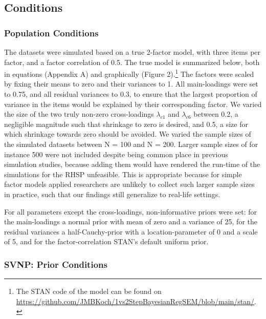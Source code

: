 \documentclass[
  man, donotrepeattitle,floatsintext]{apa6}
\begin{document}
\hypertarget{conditions}{%
\subsection{Conditions}\label{conditions}}

\hypertarget{population-conditions}{%
\subsubsection{Population Conditions}\label{population-conditions}}

The datasets were simulated based on a true 2-factor model, with three items per factor, and a factor correlation of 0.5. The true model is summarized below, both in equations (Appendix A) and graphically (Figure 2).\footnote{The STAN code of the model can be found on \url{https://github.com/JMBKoch/1vs2StepBayesianRegSEM/blob/main/stan/}.} The factors were scaled by fixing their means to zero and their variances to 1. All main-loadings were set to 0.75, and all residual variances to 0.3, to ensure that the largest proportion of variance in the items would be explained by their corresponding factor. We varied the size of the two truly non-zero cross-loadings \(\lambda_{c 1}\) and \(\lambda_{c 6}\) between 0.2, a negligible magnitude such that shrinkage to zero is desired, and 0.5, a size for which shrinkage towards zero should be avoided. We varied the sample sizes of the simulated datasets between N = 100 and N = 200. Larger sample sizes of for instance 500 were not included despite being common place in previous simulation studies, because adding them would have rendered the run-time of the simulations for the RHSP unfeasible. This is appropriate because for simple factor models applied researchers are unlikely to collect such larger sample sizes in practice, such that our findings still generalize to real-life settings.

For all parameters except the cross-loadings, non-informative priors were set: for the main-loadings a normal prior with mean of zero and a variance of 25, for the residual variances a half-Cauchy-prior with a location-parameter of 0 and a scale of 5, and for the factor-correlation STAN's default uniform prior.

\hypertarget{svnp-prior-conditions}{%
\subsubsection{SVNP: Prior Conditions}\label{svnp-prior-conditions}}
\end{document}
